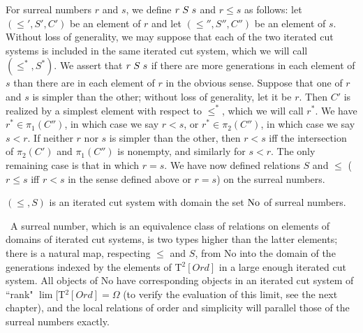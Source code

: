 \begin{definition}
 For surreal numbers $r$ and $s$, we define $r \mathrel{S} s$ and $r \leq s$ as
 follows: let $(\leq',S',C')$ be an element of $r$ and let $(\leq'',S'',C'')$
 be an element of $s$.  Without loss of generality, we may suppose that each
 of the two iterated cut systems is included in the same iterated cut
 system, which we will call $(\leq^*,S^*)$.  We assert that $r \mathrel{S} s$ if there
 are more generations in each element of $s$ than there are in each
 element of $r$ in the obvious sense.  Suppose that one of $r$ and $s$ is
 simpler than the other; without loss of generality, let it be $r$.  Then
 $C'$ is realized by a simplest element with respect to $\leq^*$, which we
 will call $r^*$.  We have $r^* \in \pi_1(C'')$, in which case we say $r < s$,
 or $r^* \in 
 \pi_2(C'')$, in which case we say $s < r$.  If neither $r$ nor $s$ is simpler
 than the other, then $r < s$ iff the intersection
 of $\pi_2(C')$ and 
 $\pi_1(C'')$ is nonempty, and similarly for $s < r$.  The only
 remaining case is that in which $r=s$.  We have now defined
 relations 
 $S$ and $\leq$ ($r \leq s$ iff $r < s$ in the sense defined above or
 $r = s$) on the surreal numbers.
\end{definition}

\begin{thm}
 $(\leq,S)$ is an iterated cut system with domain the set $\mathrm{No}$
 of surreal numbers.
\end{thm}

\preuve\  A surreal number, which is an equivalence class of relations 
on elements of domains of iterated cut systems, is two types higher than the latter elements; there is a natural map, respecting
$\leq$ and $S$, 
from No into the domain of the generations indexed by
the elements of T$^2[Ord]$ in 
a large enough iterated cut system.  All objects of No have
corresponding objects in an iterated cut system of ``rank"
$\lim[$T$^2[Ord]= \Omega$ (to verify the evaluation of this limit, see the next chapter), and the local relations of order and simplicity will parallel those of the surreal numbers exactly.

